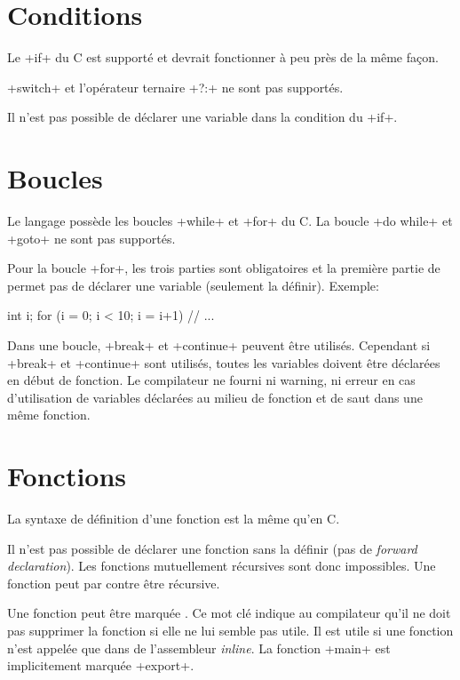 \documentclass[a4paper]{article}
\begin{document}
  \section{Conditions}
    Le \imoc+if+ du C est supporté et devrait fonctionner à peu près de la même
    façon.

    \imoc+switch+ et l'opérateur ternaire \imoc+?:+ ne sont pas supportés.

    Il n'est pas possible de déclarer une variable dans la condition du
    \imoc+if+.

  \section{Boucles}
    Le langage possède les boucles \imoc+while+ et \imoc+for+ du C. La boucle
    \imoc+do {} while+ et \imoc+goto+ ne sont pas supportés.

    Pour la boucle \imoc+for+, les trois parties sont obligatoires et la
    première partie de permet pas de déclarer une variable (seulement la
    définir). Exemple:

    \begin{moc}
int i;
for (i = 0; i < 10; i = i+1) {
    // ...
}
    \end{moc}

    Dans une boucle, \imoc+break+ et \imoc+continue+ peuvent être utilisés.
    Cependant si \imoc+break+ et \imoc+continue+ sont utilisés, toutes les
    variables doivent être déclarées en début de fonction. Le compilateur ne
    fourni ni warning, ni erreur en cas d'utilisation de variables déclarées au
    milieu de fonction et de saut dans une même fonction.

  \section{Fonctions}
    La syntaxe de définition d'une fonction est la même qu'en C.

    Il n'est pas possible de déclarer une fonction sans la définir (pas de
    \emph{forward declaration}). Les fonctions mutuellement récursives sont donc
    impossibles. Une fonction peut par contre être récursive.

    Une fonction peut être marquée . Ce mot clé indique au
    compilateur qu'il ne doit pas supprimer la fonction si elle ne lui semble
    pas utile. Il est utile si une fonction n'est appelée que dans de
    l'assembleur \emph{inline}. La fonction \imoc+main+ est implicitement
    marquée \imoc+export+.
\end{document}
